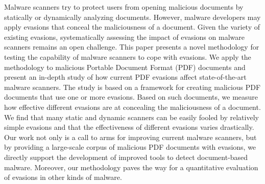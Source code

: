 Malware scanners try to protect users from opening malicious documents by statically or dynamically analyzing documents.
However, malware developers may apply evasions that conceal the maliciousness of a document.
Given the variety of existing evasions, systematically assessing the impact of evasions on malware scanners remains an open challenge.
This paper presents a novel methodology for testing the capability of malware scanners to cope with evasions.
We apply the methodology to malicious Portable Document Format (PDF) documents and present an in-depth study of how current PDF evasions affect \nbAnalyzers{} state-of-the-art malware scanners.
The study is based on a framework for creating malicious PDF documents that use one or more evasions.
Based on such documents, we measure how effective different evasions are at concealing the maliciousness of a document.
We find that many static and dynamic scanners can be easily fooled by relatively simple evasions and that the effectiveness of different evasions varies drastically.
Our work not only is a call to arms for improving current malware scanners, but by providing a large-scale corpus of malicious PDF documents with evasions, we directly support the development of improved tools to detect document-based malware.
Moreover, our methodology paves the way for a quantitative evaluation of evasions in other kinds of malware.
